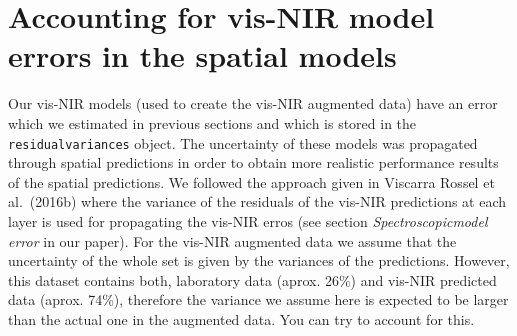 \documentclass[]{book}
\begin{document}
\hypertarget{accounting-for-vis-nir-model-errors-in-the-spatial-models}{%
\section{Accounting for vis-NIR model errors in the spatial models}\label{accounting-for-vis-nir-model-errors-in-the-spatial-models}}

Our vis-NIR models (used to create the vis-NIR augmented data) have an error which we estimated in previous sections and which is stored in the \texttt{residualvariances} object. The uncertainty of these models was propagated through spatial predictions in order to obtain more realistic performance results of the spatial predictions. We followed the approach given in Viscarra Rossel et al.~(2016b) where the variance of the residuals of the vis-NIR predictions at each layer is used for propagating the vis-NIR erros (see section \emph{Spectroscopicmodel error} in our paper).
For the vis-NIR augmented data we assume that the uncertainty of the whole set is given by the variances of the predictions. However, this dataset contains both, laboratory data (aprox. 26\%) and vis-NIR predicted data (aprox. 74\%), therefore the variance we assume here is expected to be larger than the actual one in the augmented data. You can try to account for this.
\end{document}
